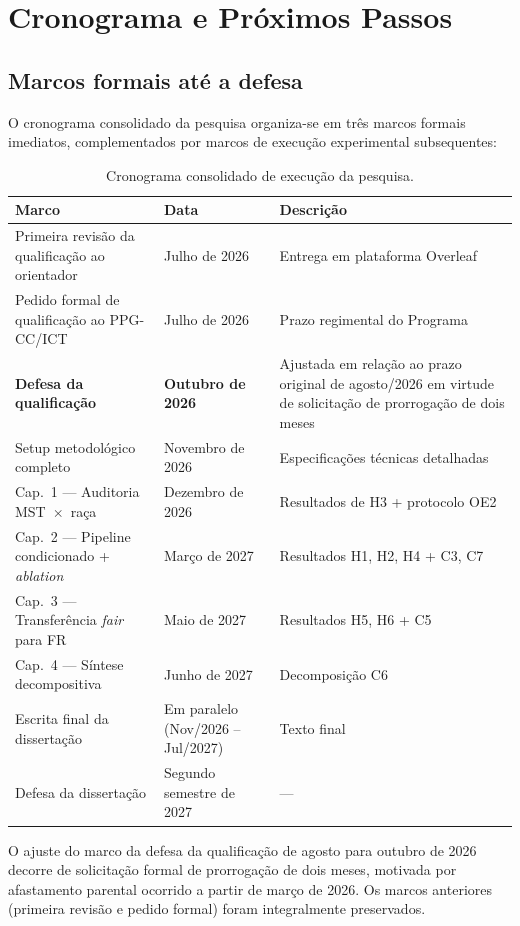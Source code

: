 \section{Cronograma e Próximos Passos}
\label{sec:cronograma}

\subsection{Marcos formais até a defesa}
\label{sec:cron_marcos}

O cronograma consolidado da pesquisa organiza-se em três marcos formais imediatos, complementados por marcos de execução experimental subsequentes:

\begin{table}[htbp]
\centering
\small
\begin{tabular}{p{6.5cm}p{2.8cm}p{5.5cm}}
\toprule
\textbf{Marco} & \textbf{Data} & \textbf{Descrição} \\
\midrule
Primeira revisão da qualificação ao orientador & Julho de 2026 & Entrega em plataforma Overleaf \\
Pedido formal de qualificação ao PPG-CC/ICT & Julho de 2026 & Prazo regimental do Programa \\
\textbf{Defesa da qualificação} & \textbf{Outubro de 2026} & Ajustada em relação ao prazo original de agosto/2026 em virtude de solicitação de prorrogação de dois meses \\
Setup metodológico completo & Novembro de 2026 & Especificações técnicas detalhadas \\
Cap.~1 --- Auditoria MST~$\times$~raça & Dezembro de 2026 & Resultados de H3 + protocolo OE2 \\
Cap.~2 --- Pipeline condicionado + \emph{ablation} & Março de 2027 & Resultados H1, H2, H4 + C3, C7 \\
Cap.~3 --- Transferência \emph{fair} para FR & Maio de 2027 & Resultados H5, H6 + C5 \\
Cap.~4 --- Síntese decompositiva & Junho de 2027 & Decomposição C6 \\
Escrita final da dissertação & Em paralelo (Nov/2026 -- Jul/2027) & Texto final \\
Defesa da dissertação & Segundo semestre de 2027 & --- \\
\bottomrule
\end{tabular}
\caption{Cronograma consolidado de execução da pesquisa.}
\label{tab:cronograma}
\end{table}

O ajuste do marco da defesa da qualificação de agosto para outubro de 2026 decorre de solicitação formal de prorrogação de dois meses, motivada por afastamento parental ocorrido a partir de março de 2026. Os marcos anteriores (primeira revisão e pedido formal) foram integralmente preservados.


